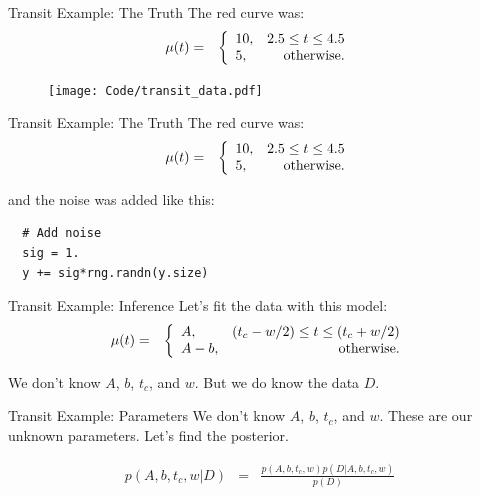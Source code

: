 \begin{frame}[t]{Transit Example: The Truth}
The red curve was:
\begin{eqnarray*}
\mu(t) &=& \left\{
\begin{array}{lr}
10, & 2.5 \leq t \leq 4.5\\
5,  & \textnormal{otherwise}.
\end{array}
\right.
\end{eqnarray*}

\begin{figure}
\texttt{[image: Code/transit\_data.pdf]}
\end{figure}
\end{frame}

\begin{frame}[fragile, t]{Transit Example: The Truth}
The red curve was:
\begin{eqnarray*}
\mu(t) &=& \left\{
\begin{array}{lr}
10, & 2.5 \leq t \leq 4.5\\
5,  & \textnormal{otherwise}.
\end{array}
\right.
\end{eqnarray*}

and the noise was added like this:
\begin{verbatim}
  # Add noise
  sig = 1.
  y += sig*rng.randn(y.size)
\end{verbatim}
\end{frame}

\begin{frame}[fragile, t]{Transit Example: Inference}
Let's fit the data with this model:
\begin{eqnarray*}
\mu(t) &=& \left\{
\begin{array}{lr}
A, & (t_c - w/2) \leq t \leq (t_c + w/2)\\
A-b,  & \textnormal{otherwise}.
\end{array}
\right.
\end{eqnarray*}

We don't know $A$, $b$, $t_c$, and $w$. But we do know the data $D$.
\end{frame}



\begin{frame}[fragile, t]{Transit Example: Parameters}
We don't know $A$, $b$, $t_c$, and $w$.
These are our unknown parameters. Let's find the posterior.

\begin{eqnarray*}
p(A, b, t_c, w | D) &=& \frac{p(A, b, t_c, w)p(D | A, b, t_c, w)}{p(D)}
\end{eqnarray*}
\end{frame}

